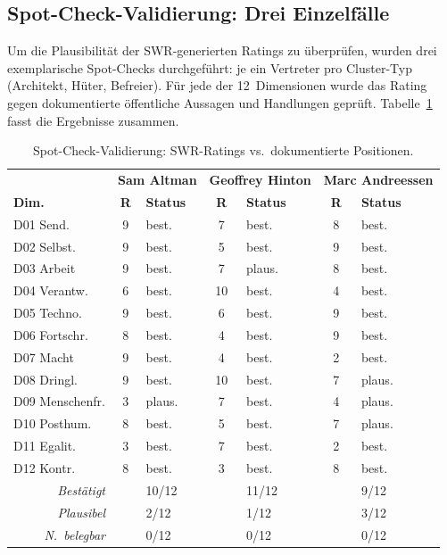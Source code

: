 \documentclass[12pt,a4paper]{article}
\begin{document}
\subsection{Spot-Check-Validierung: Drei Einzelf\"alle}
\label{sec:limitationen:spotchecks}

Um die Plausibilit\"at der SWR-generierten Ratings zu \"uberpr\"ufen, wurden drei exemplarische Spot-Checks durchgef\"uhrt: je ein Vertreter pro Cluster-Typ (Architekt, H\"uter, Befreier). F\"ur jede der 12~Dimensionen wurde das Rating gegen dokumentierte \"offentliche Aussagen und Handlungen gepr\"uft. Tabelle~\ref{tab:spotchecks} fasst die Ergebnisse zusammen.

\begin{table}[htbp]
  \centering
  \caption{Spot-Check-Validierung: SWR-Ratings vs.\ dokumentierte Positionen.}
  \label{tab:spotchecks}
  \footnotesize
  \begin{tabularx}{\textwidth}{l c l c l c l}
    \toprule
    & \multicolumn{2}{c}{\textbf{Sam Altman}} & \multicolumn{2}{c}{\textbf{Geoffrey Hinton}} & \multicolumn{2}{c}{\textbf{Marc Andreessen}} \\
    \textbf{Dim.} & \textbf{R} & \textbf{Status} & \textbf{R} & \textbf{Status} & \textbf{R} & \textbf{Status} \\
    \midrule
    D01 Send. & 9 & best. & 7 & best. & 8 & best. \\
    D02 Selbst. & 9 & best. & 5 & best. & 9 & best. \\
    D03 Arbeit & 9 & best. & 7 & plaus. & 8 & best. \\
    D04 Verantw. & 6 & best. & 10 & best. & 4 & best. \\
    D05 Techno. & 9 & best. & 6 & best. & 9 & best. \\
    D06 Fortschr. & 8 & best. & 4 & best. & 9 & best. \\
    D07 Macht & 9 & best. & 4 & best. & 2 & best. \\
    D08 Dringl. & 9 & best. & 10 & best. & 7 & plaus. \\
    D09 Menschenfr. & 3 & plaus. & 7 & best. & 4 & plaus. \\
    D10 Posthum. & 8 & best. & 5 & best. & 7 & plaus. \\
    D11 Egalit. & 3 & best. & 7 & best. & 2 & best. \\
    D12 Kontr. & 8 & best. & 3 & best. & 8 & best. \\
    \midrule
    \multicolumn{1}{r}{\textit{Best\"atigt}} & & 10/12 & & 11/12 & & 9/12 \\
    \multicolumn{1}{r}{\textit{Plausibel}} & & 2/12 & & 1/12 & & 3/12 \\
    \multicolumn{1}{r}{\textit{N.\ belegbar}} & & 0/12 & & 0/12 & & 0/12 \\
    \bottomrule
  \end{tabularx}
\end{table}
\end{document}
